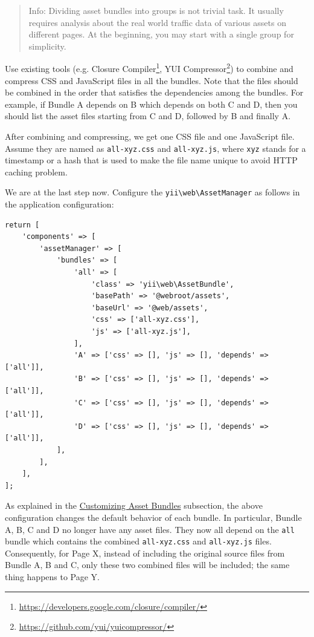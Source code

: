 \begin{quote}Info: Dividing asset bundles into groups is not trivial task. It usually requires analysis about the real world
  traffic data of various assets on different pages. At the beginning, you may start with a single group for simplicity. 

\end{quote}
Use existing tools (e.g. Closure Compiler\footnote{\url{https://developers.google.com/closure/compiler/}}, 
YUI Compressor\footnote{\url{https://github.com/yui/yuicompressor/}}) to combine and compress CSS and JavaScript files in 
all the bundles. Note that the files should be combined in the order that satisfies the dependencies among the bundles. 
For example, if Bundle A depends on B which depends on both C and D, then you should list the asset files starting 
from C and D, followed by B and finally A. 

After combining and compressing, we get one CSS file and one JavaScript file. Assume they are named as 
\lstinline|all-xyz.css| and \lstinline|all-xyz.js|, where \lstinline|xyz| stands for a timestamp or a hash that is used to make the file name unique
to avoid HTTP caching problem.

We are at the last step now. Configure the \texttt{yii{\allowbreak{}\textbackslash}web{\allowbreak{}\textbackslash}AssetManager} as follows in the application
configuration:

\lstset{language=php}\begin{lstlisting}
return [
    'components' => [
        'assetManager' => [
            'bundles' => [
                'all' => [
                    'class' => 'yii\web\AssetBundle',
                    'basePath' => '@webroot/assets',
                    'baseUrl' => '@web/assets',
                    'css' => ['all-xyz.css'],
                    'js' => ['all-xyz.js'],
                ],
                'A' => ['css' => [], 'js' => [], 'depends' => ['all']],
                'B' => ['css' => [], 'js' => [], 'depends' => ['all']],
                'C' => ['css' => [], 'js' => [], 'depends' => ['all']],
                'D' => ['css' => [], 'js' => [], 'depends' => ['all']],
            ],
        ],
    ],
];
\end{lstlisting}
As explained in the \hyperref[structure-assets.md::::customizing-asset-bundles]{Customizing Asset Bundles} subsection, the above configuration
changes the default behavior of each bundle. In particular, Bundle A, B, C and D no longer have any asset files.
They now all depend on the \lstinline|all| bundle which contains the combined \lstinline|all-xyz.css| and \lstinline|all-xyz.js| files.
Consequently, for Page X, instead of including the original source files from Bundle A, B and C, only these
two combined files will be included; the same thing happens to Page Y.

